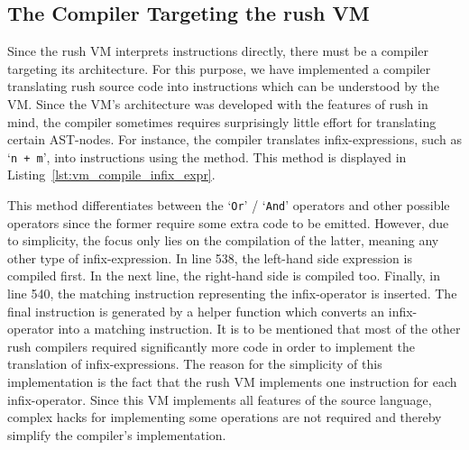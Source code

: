 \subsection{The Compiler Targeting the rush VM}\label{sec:vm_compiler}

Since the rush VM interprets instructions directly, there must be a compiler targeting its architecture.
For this purpose, we have implemented a compiler translating rush source code into instructions which can be understood by the VM\@.
Since the VM's architecture was developed with the features of rush in mind,
the compiler sometimes requires surprisingly little effort for translating certain AST-nodes.
For instance, the compiler translates infix-expressions, such as `\texttt{n + m}', into instructions using the  method.
This method is displayed in Listing~\ref{lst:vm_compile_infix_expr}.


This method differentiates between the `\texttt{Or}' / `\texttt{And}' operators and other possible operators since the former require some extra code to be emitted.
However, due to simplicity, the focus only lies on the compilation of the latter, meaning any other type of infix-expression.
In line 538, the left-hand side expression is compiled first.
In the next line, the right-hand side is compiled too.
Finally, in line 540, the matching instruction representing the infix-operator is inserted.
The final instruction is generated by a helper function which converts an infix-operator into a matching instruction.
It is to be mentioned that most of the other rush compilers required significantly more code in order to implement the translation of infix-expressions.
The reason for the simplicity of this implementation is the fact that the rush VM implements one instruction for each infix-operator.
Since this VM implements all features of the source language, complex hacks for implementing some operations are not required and thereby simplify the compiler's implementation.


